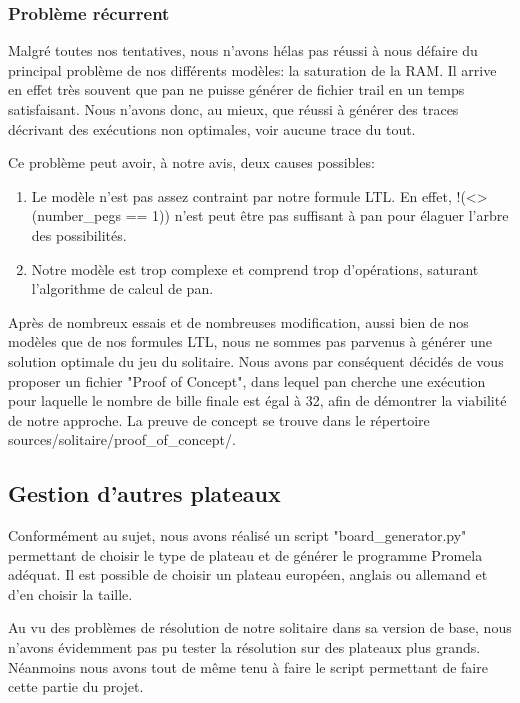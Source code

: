 \documentclass[12pt, a4paper]{report}
\begin{document}
\subsubsection{Problème récurrent}

Malgré toutes nos tentatives, nous n'avons hélas pas réussi à nous défaire du principal problème de nos différents modèles: la saturation de la RAM. Il arrive en effet très souvent que pan ne puisse générer de fichier trail en un temps satisfaisant. Nous n'avons donc, au mieux, que réussi à générer des traces décrivant des exécutions non optimales, voir aucune trace du tout.

Ce problème peut avoir, à notre avis, deux causes possibles:
\begin{enumerate}
\item Le modèle n'est pas assez contraint par notre formule LTL. En effet, !(<>(number\_pegs == 1)) n'est peut être pas suffisant à pan pour élaguer l'arbre des possibilités.
\item Notre modèle est trop complexe et comprend trop d'opérations, saturant l'algorithme de calcul de pan.
\end{enumerate}

Après de nombreux essais et de nombreuses modification, aussi bien de nos modèles que de nos formules LTL, nous ne sommes pas parvenus à générer une solution optimale du jeu du solitaire.
Nous avons par conséquent décidés de vous proposer un fichier "Proof of Concept", dans lequel pan cherche une exécution pour laquelle le nombre de bille finale est égal à 32, afin de démontrer la viabilité de notre approche. La preuve de concept se trouve dans le répertoire sources/solitaire/proof\_of\_concept/.

\subsection{Gestion d'autres plateaux}

Conformément au sujet, nous avons réalisé un script "board\_generator.py" permettant de choisir le type de plateau et de générer le programme Promela adéquat. Il est possible de choisir un plateau européen, anglais ou allemand et d'en choisir la taille.

Au vu des problèmes de résolution de notre solitaire dans sa version de base, nous n'avons évidemment pas pu tester la résolution sur des plateaux plus grands. Néanmoins nous avons tout de même tenu à faire le script permettant de faire cette partie du projet.
\end{document}
